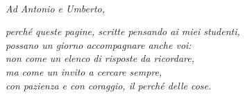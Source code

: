 \cleardoublepage
\thispagestyle{empty}
\null\vspace*{0.22\textheight}
\begin{center}
  {}\\[10mm]
  {\large\itshape Ad Antonio e Umberto,}\\[8mm]
  \begin{minipage}{0.8\textwidth}
  \centering\itshape
  perché queste pagine, scritte pensando ai miei studenti,\\
  possano un giorno accompagnare anche voi:\\
  non come un elenco di risposte da ricordare,\\
  ma come un invito a cercare sempre,\\
  con pazienza e con coraggio, il perché delle cose.
  \end{minipage}
\end{center}
\vfill
\cleardoublepage
